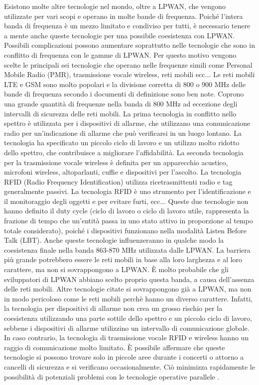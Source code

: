 \documentclass[a4paper]{report} %
\begin{document}
Esistono molte altre tecnologie nel mondo, oltre a LPWAN, che vengono utilizzate per vari scopi e operano in molte bande di frequenza. Poiché l'intera banda di frequenza è un mezzo limitato e condiviso per tutti, è necessario tenere a mente anche queste tecnologie per una possibile coesistenza con LPWAN. Possibili complicazioni possono aumentare soprattutto nelle tecnologie che sono in conflitto di frequenza con le gamme di LPWAN. Per questo motivo vengono scelte le principali sei tecnologie che operano nelle frequenze simili come Personal Mobile Radio (PMR), trasmissione vocale wireless, reti mobili ecc... Le reti mobili LTE e GSM sono molto popolari e la divisione corretta di 800 o 900 MHz delle bande di frequenza secondo i documenti di definizione sono ben note. Coprono una grande quantità di frequenze nella banda di 800 MHz ad eccezione degli intervalli di sicurezza delle reti mobili. 
La prima tecnologia in conflitto nello spettro è utilizzata per i dispositivi di allarme, che utilizzano una comunicazione radio per un'indicazione di allarme che può verificarsi in un luogo lontano. La tecnologia ha specificato un piccolo ciclo di lavoro e un utilizzo molto ridotto dello spettro, che contribuisce a migliorare l'affidabilità. 
La seconda tecnologia per la trasmissione vocale wireless è definita per un apparecchio acustico, microfoni wireless, altoparlanti, cuffie e dispositivi per l'ascolto. La tecnologia RFID (Radio Frequency Identification) utilizza ricetrasmittenti radio e tag generalmente passivi. La tecnologia RFID è uno strumento per l'identificazione e il monitoraggio degli oggetti e per evitare furti, ecc... Queste due tecnologie non hanno definito il duty cycle (ciclo di lavoro o ciclo di lavoro utile, rappresenta la frazione di tempo che un'entità passa in uno stato attivo in proporzione al tempo totale considerato), poiché i dispositivi funzionano nella modalità Listen Before Talk (LBT). Anche queste tecnologie influenzeranno in qualche modo la coesistenza finale nella banda 863-870 MHz utilizzata dalle LPWAN. La barriera più grande potrebbero essere le reti mobili in base alla loro larghezza e al loro carattere, ma non si sovrappongono a LPWAN. È molto probabile che gli sviluppatori di LPWAN abbiano scelto proprio questa banda, a causa dell'assenza delle reti mobili. Altre tecnologie citate si sovrappongono già a LPWAN, ma non in modo pericoloso come le reti mobili perchè hanno un diverso carattere. Infatti, la tecnologia per dispositivi di allarme non crea un grosso rischio per la coesistenza utilizzando una parte sottile dello spettro e un piccolo ciclo di lavoro, sebbene i dispositivi di allarme utilizzino un intervallo di comunicazione globale. In caso contrario, la tecnologia di trasmissione vocale RFID e wireless hanno un raggio di comunicazione molto limitato. È possibile affermare che queste tecnologie si possono trovare solo in piccole aree durante i concerti o attorno a cancelli di sicurezza e si verificano occasionalmente. Ciò minimizza rapidamente le possibilità di potenziali problemi con le tecnologie operative parallele \cite{art:rif.46}.
\end{document}
